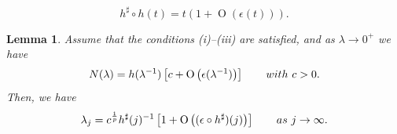 \documentclass[10pt,a4paper]{amsart}
\newtheorem{lemma}{Lemma}
\newcommand{\op}{\operatorname}
\begin{document}
\begin{equation}\label{cond:hsharp}
 h^\sharp\circ h(t)= t\left(1+\op{O}(\epsilon(t))\right).
\end{equation}

\begin{lemma}\label{lem:app.Ntolambda1}
Assume that the conditions (i)--(iii) are satisfied, and as $ \lambda\rightarrow 0^+$ we have
\begin{equation*}
 N(\lambda)= h(\lambda^{-1}) \left[ c+\op{O}\left(\epsilon(\lambda^{-1})\right)\right]  \qquad \textup{with}\ c>0. 
\end{equation*}
Then,  we have
\begin{equation}\label{eq:case c>0 result}
 \lambda_j=c^{\frac1p} h^\sharp(j)^{-1} \left[ 1+\op{O}\left((\epsilon \circ h^\sharp)(j)\right)\right] \qquad \textup{as}\ j\rightarrow \infty.
\end{equation}
\end{lemma}
\end{document}
